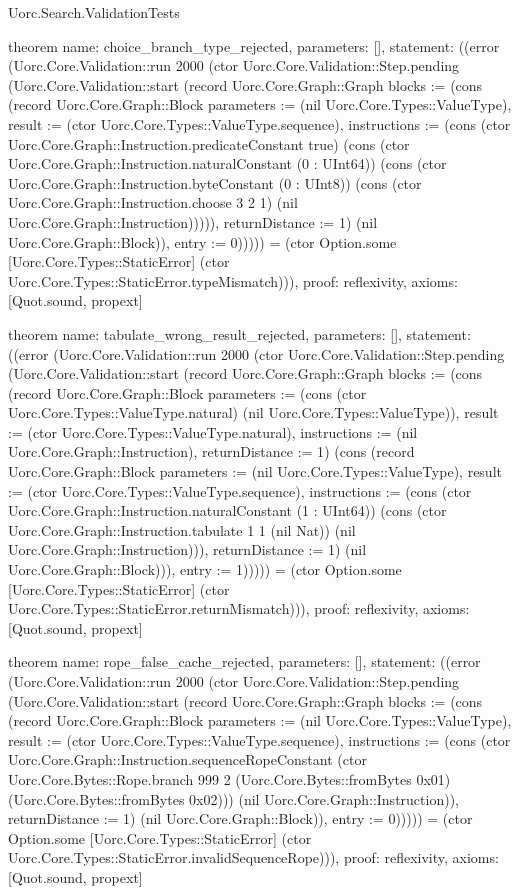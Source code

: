 \begin{lexlean}{Uorc.Search.ValidationTests}
\begin{semanticmodule}
theorem{
  name: choice_branch_type_rejected,
  parameters: [],
  statement: ((error (Uorc.Core.Validation::run 2000 (ctor Uorc.Core.Validation::Step.pending (Uorc.Core.Validation::start (record Uorc.Core.Graph::Graph {blocks := (cons (record Uorc.Core.Graph::Block {parameters := (nil Uorc.Core.Types::ValueType), result := (ctor Uorc.Core.Types::ValueType.sequence), instructions := (cons (ctor Uorc.Core.Graph::Instruction.predicateConstant true) (cons (ctor Uorc.Core.Graph::Instruction.naturalConstant (0 : UInt64)) (cons (ctor Uorc.Core.Graph::Instruction.byteConstant (0 : UInt8)) (cons (ctor Uorc.Core.Graph::Instruction.choose 3 2 1) (nil Uorc.Core.Graph::Instruction))))), returnDistance := 1}) (nil Uorc.Core.Graph::Block)), entry := 0}))))) = (ctor Option.some [Uorc.Core.Types::StaticError] (ctor Uorc.Core.Types::StaticError.typeMismatch))),
  proof: reflexivity{},
  axioms: [Quot.sound, propext]
}

theorem{
  name: tabulate_wrong_result_rejected,
  parameters: [],
  statement: ((error (Uorc.Core.Validation::run 2000 (ctor Uorc.Core.Validation::Step.pending (Uorc.Core.Validation::start (record Uorc.Core.Graph::Graph {blocks := (cons (record Uorc.Core.Graph::Block {parameters := (cons (ctor Uorc.Core.Types::ValueType.natural) (nil Uorc.Core.Types::ValueType)), result := (ctor Uorc.Core.Types::ValueType.natural), instructions := (nil Uorc.Core.Graph::Instruction), returnDistance := 1}) (cons (record Uorc.Core.Graph::Block {parameters := (nil Uorc.Core.Types::ValueType), result := (ctor Uorc.Core.Types::ValueType.sequence), instructions := (cons (ctor Uorc.Core.Graph::Instruction.naturalConstant (1 : UInt64)) (cons (ctor Uorc.Core.Graph::Instruction.tabulate 1 1 (nil Nat)) (nil Uorc.Core.Graph::Instruction))), returnDistance := 1}) (nil Uorc.Core.Graph::Block))), entry := 1}))))) = (ctor Option.some [Uorc.Core.Types::StaticError] (ctor Uorc.Core.Types::StaticError.returnMismatch))),
  proof: reflexivity{},
  axioms: [Quot.sound, propext]
}

theorem{
  name: rope_false_cache_rejected,
  parameters: [],
  statement: ((error (Uorc.Core.Validation::run 2000 (ctor Uorc.Core.Validation::Step.pending (Uorc.Core.Validation::start (record Uorc.Core.Graph::Graph {blocks := (cons (record Uorc.Core.Graph::Block {parameters := (nil Uorc.Core.Types::ValueType), result := (ctor Uorc.Core.Types::ValueType.sequence), instructions := (cons (ctor Uorc.Core.Graph::Instruction.sequenceRopeConstant (ctor Uorc.Core.Bytes::Rope.branch 999 2 (Uorc.Core.Bytes::fromBytes 0x01) (Uorc.Core.Bytes::fromBytes 0x02))) (nil Uorc.Core.Graph::Instruction)), returnDistance := 1}) (nil Uorc.Core.Graph::Block)), entry := 0}))))) = (ctor Option.some [Uorc.Core.Types::StaticError] (ctor Uorc.Core.Types::StaticError.invalidSequenceRope))),
  proof: reflexivity{},
  axioms: [Quot.sound, propext]
}


\end{semanticmodule}
\end{lexlean}
